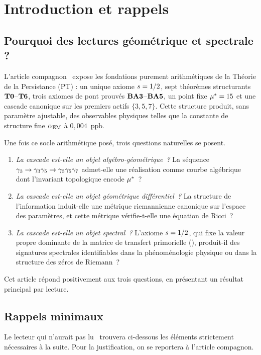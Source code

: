 \section{Introduction et rappels}
\label{sec:intro2}

\subsection{Pourquoi des lectures géométrique et spectrale ?}
\label{sec:intro2:why}

L'article compagnon~\cite{PT_Article1_Foundations} expose les fondations purement arithmétiques de la Théorie de la Persistance (PT) : un unique axiome $s = 1/2$, sept théorèmes structurants $\textbf{T0}$--$\textbf{T6}$, trois axiomes de pont prouvés $\textbf{BA3}$--$\textbf{BA5}$, un point fixe $\mu^{*} = 15$ et une cascade canonique sur les premiers actifs $\{3,5,7\}$. Cette structure produit, sans paramètre ajustable, des observables physiques telles que la constante de structure fine $\alpha_{\rm EM}$ à $0{,}004$~ppb.

Une fois ce socle arithmétique posé, trois questions naturelles se posent.
\begin{enumerate}[nosep,leftmargin=*]
\item \emph{La cascade est-elle un objet algébro-géométrique~?} La séquence $\gamma_{3} \to \gamma_{3}\gamma_{5} \to \gamma_{3}\gamma_{5}\gamma_{7}$ admet-elle une réalisation comme courbe algébrique dont l'invariant topologique encode $\mu^{*}$~?
\item \emph{La cascade est-elle un objet géométrique différentiel~?} La structure de l'information induit-elle une métrique riemannienne canonique sur l'espace des paramètres, et cette métrique vérifie-t-elle une équation de Ricci~?
\item \emph{La cascade est-elle un objet spectral~?} L'axiome $s = 1/2$, qui fixe la valeur propre dominante de la matrice de transfert primorielle (\Ttwo), produit-il des signatures spectrales identifiables dans la phénoménologie physique ou dans la structure des zéros de Riemann~?
\end{enumerate}
Cet article répond positivement aux trois questions, en présentant un résultat principal par lecture.

\subsection{Rappels minimaux}
\label{sec:intro2:rappels}

Le lecteur qui n'aurait pas lu~\cite{PT_Article1_Foundations} trouvera ci-dessous les éléments strictement nécessaires à la suite. Pour la justification, on se reportera à l'article compagnon.


